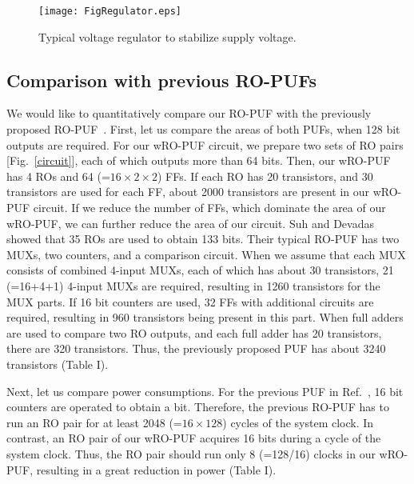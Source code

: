 \documentclass[%
reprint, amsmath,amssymb,%
pra,
]{revtex4-1}
\begin{document}
\begin{figure}
\begin{center}
\texttt{[image: FigRegulator.eps]}
\end{center}
\caption{Typical voltage regulator to stabilize supply voltage. }
\label{regulator}
\end{figure}

\subsection{Comparison with previous RO-PUFs}
We would like to quantitatively compare our RO-PUF with the previously proposed RO-PUF~\cite{Suh}.
First, let us compare the areas of both PUFs, when 128 bit outputs are required.
For our wRO-PUF circuit, we prepare two sets of RO pairs [Fig.~\ref{circuit}], each of which outputs more than 64 bits.
Then, our wRO-PUF has 4 ROs and 64 (=$16 \times 2 \times 2$) FFs.
If each RO has 20 transistors, and 30 transistors are used for each FF,
about 2000 transistors are present in our wRO-PUF circuit.
If we reduce the number of FFs, which dominate the area of our wRO-PUF, we can further
reduce the area of our circuit. 
Suh and Devadas~\cite{Suh} showed that 35 ROs are used to obtain 133 bits.
Their typical RO-PUF has two MUXs, two counters, and a comparison circuit.
When we assume that each MUX consists of combined 4-input MUXs, each of which has about 30 transistors, 
21 (=16+4+1) 4-input MUXs are required, resulting in 1260 transistors for the MUX parts.
If 16 bit counters are used, 32 FFs with additional circuits are required, resulting in 
960 transistors being present in this part.
When full adders are used to compare two RO outputs, and each full adder has 20 transistors, there are 320 transistors.  
Thus, the previously proposed PUF has about 3240 transistors  (Table I).  
 
Next, let us compare power consumptions.
For the previous PUF in Ref.~\cite{Suh}, 16 bit counters are operated to obtain a bit.
Therefore, the previous RO-PUF has to run an RO pair for at least 2048 (=$16\times128$) cycles of the system clock.
In contrast, an RO pair of our wRO-PUF acquires 16 bits during a cycle of the system clock. 
Thus, the RO pair should run only 8 (=128/16) clocks in our wRO-PUF, resulting in a great reduction in power (Table I).
\end{document}

